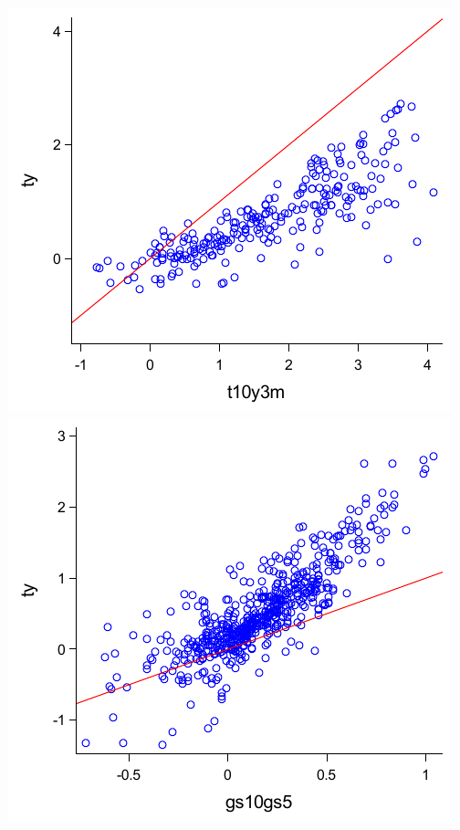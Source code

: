 \documentclass{article}
\begin{document}
\includegraphics{scatter/t10y3m}\includegraphics{scatter/gs10gs5}\\
\end{document}
